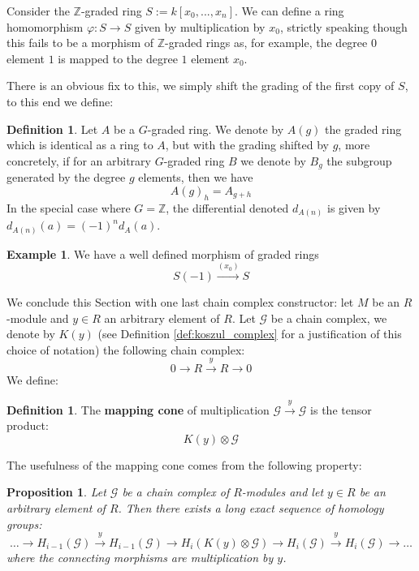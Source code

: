 \documentclass[12pt]{article}
\theoremstyle{plain}
\newtheorem{proposition}[thm]{Proposition}
\theoremstyle{definition}
\newtheorem{defn}[thm]{Definition} %
\newtheorem{example}[thm]{Example}
\newcommand{\bb}[1]{\mathbb{#1}}
\newcommand{\scr}[1]{\mathscr{#1}}
\newcommand{\lto}{\longrightarrow}
\begin{document}
Consider the $\bb{Z}$-graded ring $S := k[x_0,...,x_n]$. We can define a ring homomorphism $\varphi: S \lto S$ given by multiplication by $x_0$, strictly speaking though this fails to be a morphism of $\bb{Z}$-graded rings as, for example, the degree $0$ element $1$ is mapped to the degree $1$ element $x_0$.

There is an obvious fix to this, we simply shift the grading of the first copy of $S$, to this end we define:
\begin{defn}
Let $A$ be a $G$-graded ring. We denote by $A(g)$ the graded ring which is identical as a ring to $A$, but with the grading shifted by $g$, more concretely, if for an arbitrary $G$-graded ring $B$ we denote by $B_g$ the subgroup generated by the degree $g$ elements, then we have
\begin{equation}
A(g)_h = A_{g + h}
\end{equation}
In the special case where $G = \bb{Z}$, the differential denoted $d_{A(n)}$ is given by $d_{A(n)}(a) = (-1)^nd_A(a)$.
\end{defn}
\begin{example}
We have a well defined morphism of graded rings
\begin{equation}
S(-1) \stackrel{(x_0)}{\lto}S
\end{equation}
\end{example}
We conclude this Section with one last chain complex constructor: let $M$ be an $R$-module and $y \in R$ an arbitrary element of $R$.  Let $\scr{G}$ be a chain complex, we denote by $K(y)$ (see Definition \ref{def:koszul_complex} for a justification of this choice of notation) the following chain complex:
\begin{equation}
0 \lto R \stackrel{y}{\lto} R \lto 0
\end{equation}
We define:
\begin{defn}
The \textbf{mapping cone} of multiplication $\scr{G} \stackrel{y}{\lto} \scr{G}$ is the tensor product:
\begin{equation}
K(y) \otimes \scr{G}
\end{equation}
\end{defn}
The usefulness of the mapping cone comes from the following property:
\begin{proposition}\label{prop:mapping_exact_sequence}
Let $\scr{G}$ be a chain complex of $R$-modules and let $y\in R$ be an arbitrary element of $R$. Then there exists a long exact sequence of homology groups:
\begin{equation}\label{eq:mapping_exact_sequence}
\hdots \lto H_{i-1}(\scr{G}) \stackrel{y}{\lto} H_{i-1}(\scr{G}) \lto H_{i}(K(y) \otimes \scr{G})\lto H_i(\scr{G}) \stackrel{y}{\lto} H_{i}(\scr{G}) \lto \hdots
\end{equation}
where the connecting morphisms are multiplication by $y$.
\end{proposition}
\end{document}

